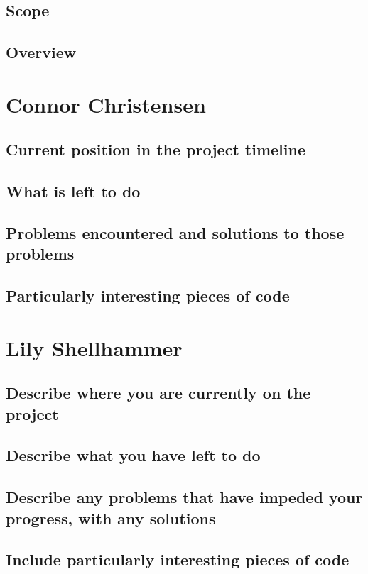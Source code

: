 \documentclass[draftclsnofoot,onecolumn,letterpaper,10pt,compsoc]{IEEEtran}
\begin{document}
\subsection{Scope}

\subsection{Overview}

\section{Connor Christensen}
\subsection{Current position in the project timeline}
\subsection{What is left to do}
\subsection{Problems encountered and solutions to those problems}
\subsection{Particularly interesting pieces of code}


\section{Lily Shellhammer}
\subsection{Describe where you are currently on the project}
\subsection{Describe what you have left to do}
\subsection{Describe any problems that have impeded your progress, with any solutions}
\subsection{Include particularly interesting pieces of code}
\end{document}
